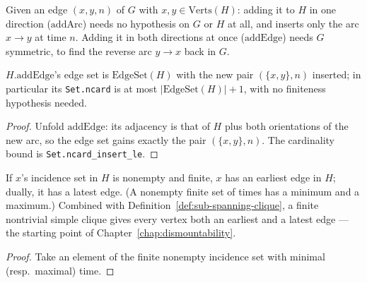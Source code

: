 \begin{definition}
  \label{def:subgraph-addEdge}
  \leanok
  Given an edge $(x,y,n)$ of $G$ with $x, y \in \mathrm{Verts}(H)$: adding it
  to $H$ in one direction ($\mathrm{addArc}$) needs no hypothesis on $G$ or
  $H$ at all, and inserts only the arc $x \to y$ at time $n$. Adding it in
  both directions at once ($\mathrm{addEdge}$) needs $G$ symmetric, to
  find the reverse arc $y \to x$ back in $G$.
\end{definition}

\begin{lemma}
  \label{lem:subgraph-addEdge-edgeSet}
  \leanok
  $H.\mathrm{addEdge}$'s edge set is $\mathrm{EdgeSet}(H)$ with the new pair
  $(\{x,y\}, n)$ inserted; in particular its \texttt{Set.ncard} is at most
  $|\mathrm{EdgeSet}(H)| + 1$, with no finiteness hypothesis needed.
\end{lemma}

\begin{proof}
  \leanok
  Unfold $\mathrm{addEdge}$: its adjacency is that of $H$ plus both orientations of the new arc, so the edge set gains exactly the pair $(\{x,y\},n)$. The cardinality bound is \texttt{Set.ncard\_insert\_le}.
\end{proof}

\begin{lemma}
  \label{lem:earliest-latest-edge-exists}
  \leanok
  If $x$'s incidence set in $H$ is nonempty and finite, $x$ has an earliest
  edge in $H$; dually, it has a latest edge. (A nonempty finite set of times
  has a minimum and a maximum.) Combined with
  Definition~\ref{def:sub-spanning-clique}, a finite nontrivial simple
  clique gives every vertex both an earliest and a latest edge — the
  starting point of Chapter~\ref{chap:dismountability}.
\end{lemma}

\begin{proof}
  \leanok
  Take an element of the finite nonempty incidence set with minimal (resp.\ maximal) time.
\end{proof}


